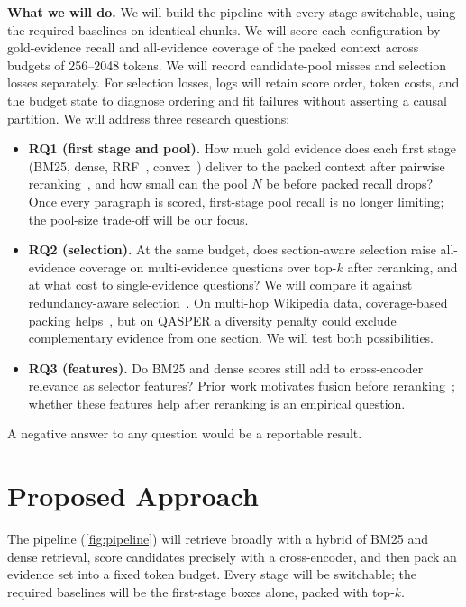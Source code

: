 \documentclass[sigconf, nonacm]{acmart}
\newcommand{\minihead}[1]{{\noindent\textbf{#1.} }}
\begin{document}
\minihead{What we will do} We will build the pipeline with every stage switchable, using the required baselines on identical chunks. We will score each configuration by gold-evidence recall and all-evidence coverage of the packed context across budgets of 256--2048 tokens. We will record candidate-pool misses and selection losses separately. For selection losses, logs will retain score order, token costs, and the budget state to diagnose ordering and fit failures without asserting a causal partition. We will address three research questions:
\begin{itemize}[leftmargin=*]
  \item \textbf{RQ1 (first stage and pool).} How much gold evidence does each first stage (BM25, dense, RRF~\cite{cormack2009rrf}, convex~\cite{bruch2023fusion}) deliver to the packed context after pairwise reranking~\cite{nogueira2019bert}, and how small can the pool $N$ be before packed recall drops? Once every paragraph is scored, first-stage pool recall is no longer limiting; the pool-size trade-off will be our focus.
  \item \textbf{RQ2 (selection).} At the same budget, does section-aware selection raise all-evidence coverage on multi-evidence questions over top-$k$ after reranking, and at what cost to single-evidence questions? We will compare it against redundancy-aware selection~\cite{carbonell1998mmr, peng2025adagres, yu2026sfrag, matrixcontext}. On multi-hop Wikipedia data, coverage-based packing helps~\cite{bala2026recall}, but on QASPER a diversity penalty could exclude complementary evidence from one section. We will test both possibilities.
  \item \textbf{RQ3 (features).} Do BM25 and dense scores still add to cross-encoder relevance as selector features? Prior work motivates fusion before reranking~\cite{wang2021interpolate}; whether these features help after reranking is an empirical question.
\end{itemize}
A negative answer to any question would be a reportable result.

\section{Proposed Approach}

The pipeline (\autoref{fig:pipeline}) will retrieve broadly with a hybrid of BM25 and dense retrieval, score candidates precisely with a cross-encoder, and then pack an evidence set into a fixed token budget. Every stage will be switchable; the required baselines will be the first-stage boxes alone, packed with top-$k$.
\end{document}
